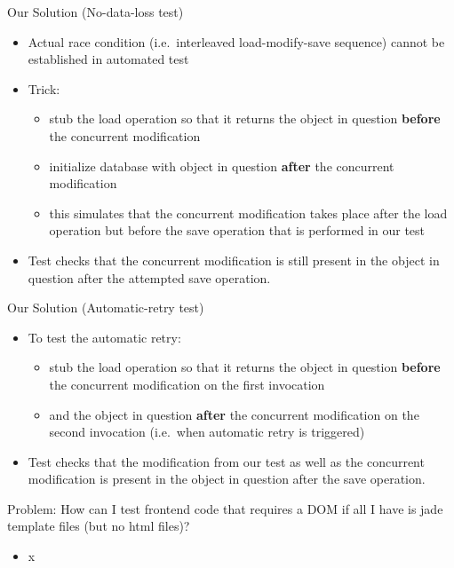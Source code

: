 \begin{frame}{Our Solution (No-data-loss test)}
\begin{itemize}
\item Actual race condition (i.e.~interleaved load-modify-save sequence) cannot be established in automated test
\item Trick:
\begin{itemize}
\item stub the load operation so that it returns the object in question \textbf{before} the concurrent modification
\item initialize database with object in question \textbf{after} the concurrent modification
\item this simulates that the concurrent modification takes place after the load operation but before the save operation that is performed in our test
\end{itemize}
\item Test checks that the concurrent modification is still present in the object in question after the attempted save operation.
\end{itemize}
\end{frame}

\begin{frame}{Our Solution (Automatic-retry test)}
\begin{itemize}
\item To test the automatic retry:
\begin{itemize}
\item stub the load operation so that it returns the object in question \textbf{before} the concurrent modification on the first invocation
\item and the object in question \textbf{after} the concurrent modification on the second invocation (i.e.~when automatic retry is triggered)
\end{itemize}
\item Test checks that the modification from our test as well as the concurrent modification is present in the object in question after the save operation.
\end{itemize}
\end{frame}


\begin{frame}{Problem: How can I test frontend code that requires a DOM if all I have is jade template files (but no html files)?}
\begin{itemize}
\item x
\end{itemize}
\end{frame}


